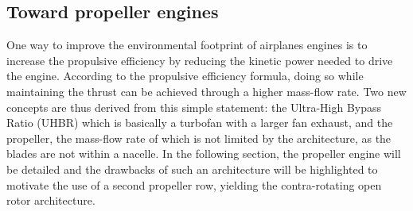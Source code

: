 \subsection{Toward propeller engines}
\label{sub:cror_toward_propeller}

One way to improve the environmental footprint of
airplanes engines is to increase the propulsive efficiency
by reducing the kinetic power needed to drive the engine.
According to the propulsive efficiency 
formula, doing so while maintaining the thrust can be achieved through
a higher mass-flow rate. Two new concepts are thus derived from
this simple statement: the
Ultra-High Bypass Ratio (UHBR) which
is basically a turbofan with a larger fan exhaust, and the
propeller, the mass-flow rate of which is not limited
by the architecture, as the blades are not within a nacelle.
In the following section, the propeller engine will be detailed
and the drawbacks of such an architecture will be highlighted to
motivate the use
of a second propeller row, yielding the contra-rotating open rotor
architecture.


